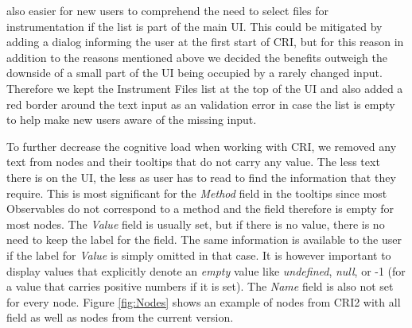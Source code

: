 also easier for new users to comprehend the need to select files for instrumentation if the list is part of the main UI. This could be mitigated by adding a dialog informing the user at the first start of CRI, but for this reason in addition to the reasons mentioned above we decided the benefits outweigh the downside of a small part of the UI being occupied by a rarely changed input. Therefore we kept the Instrument Files list at the top of the UI and also added a red border around the text input as an validation error in case the list is empty to help make new users aware of the missing input.

To further decrease the cognitive load when working with CRI, we removed any text from nodes and their tooltips that do not carry any value. The less text there is on the UI, the less as user has to read to find the information that they require. This is most significant for the \emph{Method} field in the tooltips since most Observables do not correspond to a method and the field therefore is empty for most nodes. The \emph{Value} field is usually set, but if there is no value, there is no need to keep the label for the field. The same information is available to the user if the label for \emph{Value} is simply omitted in that case.
It is however important to display values that explicitly denote an \emph{empty} value like \emph{undefined}, \emph{null}, or -1 (for a value that carries positive numbers if it is set). The \emph{Name} field is also not set for every node. Figure \ref{fig:Nodes} shows an example of nodes from CRI2 with all field as well as nodes from the current version.

